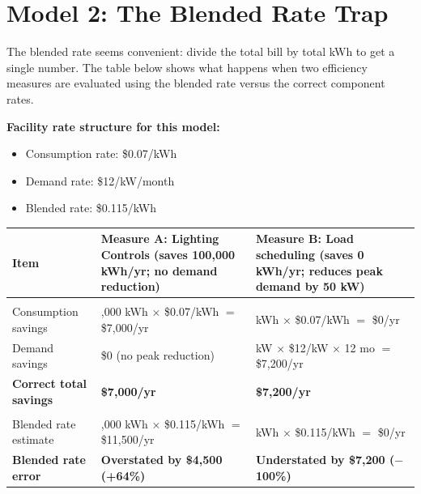 \documentclass[./main.tex]{subfiles}
\begin{document}
\clearpage
\section*{Model 2: The Blended Rate Trap}

The blended rate seems convenient: divide the total bill by total kWh to get a
single number. The table below shows what happens when two efficiency measures
are evaluated using the blended rate versus the correct component rates.

\medskip
\noindent\textbf{Facility rate structure for this model:}
\begin{itemize}
      \item Consumption rate: \$0.07/kWh
      \item Demand rate: \$12/kW/month
      \item Blended rate: \$0.115/kWh
\end{itemize}


\begin{longtable}[]{@{}
  >{\raggedright\arraybackslash}p{}
  >{\raggedright\arraybackslash}p{}
  >{\raggedright\arraybackslash}p{}@{}}
\toprule\noalign{}
\textbf{Item}
& \textbf{Measure A: Lighting Controls (saves 100,000 kWh/yr; no demand reduction)}
& \textbf{Measure B: Load scheduling (saves 0 kWh/yr; reduces peak demand by 50 kW)} \\
\midrule\noalign{}
\endhead
\bottomrule\noalign{}
\endlastfoot
\multicolumn{3}{@{}l@{}}{\textbf{Correct calculation (component rates)}} \\
Consumption savings
  & 100,000 kWh $\times$ \$0.07/kWh $=$ \$7,000/yr
  & 0 kWh $\times$ \$0.07/kWh $=$ \$0/yr \\
Demand savings
  & \$0 (no peak reduction)
  & 50 kW $\times$ \$12/kW $\times$ 12 mo $=$ \$7,200/yr \\
\textbf{Correct total savings} & \textbf{\$7,000/yr} & \textbf{\$7,200/yr} \\
\multicolumn{3}{@{}l@{}}{\textbf{Blended rate calculation}} \\
Blended rate estimate
  & 100,000 kWh $\times$ \$0.115/kWh $=$ \$11,500/yr
  & 0 kWh $\times$ \$0.115/kWh $=$ \$0/yr \\
\textbf{Blended rate error}
  & \textbf{Overstated by \$4,500 (+64\%)}
  & \textbf{Understated by \$7,200 ($-$100\%)} \\
\end{longtable}
\end{document}
